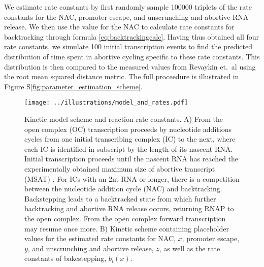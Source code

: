 We estimate rate constants by first randomly sample 100000 triplets of the
rate constants for the NAC, promoter escape, and unscrunching and abortive RNA
release. We then use the value for the NAC to calculate rate constants for
backtracking through formula \eqref{eq:backtrackingcalc}. Having thus obtained
all four rate constants, we simulate 100 initial transcription events to find the
predicted distribution of time spent in abortive cycling specific to these
rate constants. This distribution is then compared to the measured values from
Revaykin et.\ al \cite{revyakin_abortive_2006} using the root mean squared
distance metric. The full proceedure is illustrated in Figure
S\ref{fig:parameter_estimation_scheme}.

\begin{figure}
	\begin{center}
        \texttt{[image: ../illustrations/model\_and\_rates.pdf]}
	\end{center}
    \caption{Kinetic model scheme and reaction rate constants. A) From the
    open complex (OC) transcription proceeds by nucleotide additions cycles
    from one initial transcribing complex (IC) to the next, where each IC is
    identified in subscript by the length of its nascent RNA. Initial
    transcription proceeds until the nascent RNA has reached the
    experimentally obtained maximum size of abortive transcript (MSAT)
    \cite{hsu_initial_2006}. For ICs with an 2nt RNA or longer, there is a
    competition between the nucleotide addition cycle (NAC) and backtracking.
    Backstepping leads to a backtracked state from which further backtracking
    and abortive RNA release occurs, returning RNAP to the open complex. From
    the open complex forward transcription may resume once more. B) Kinetic
    scheme containing placeholder values for the estimated rate constants for
    NAC, $x$, promoter escape, $y$, and unscrunching and abortive release, $z$,
    as well as the rate constants of bakcstepping, $b_i(x)$.}
    \label{fig:model_and_rates}
\end{figure}

